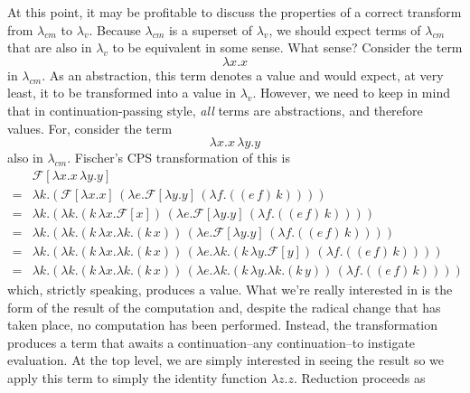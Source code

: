 \documentclass[ms,electronic,twosidetoc,letterpaper,chaptercenter,parttop]{byumsphd}
\begin{document}
At this point, it may be profitable to discuss the properties of a correct transform from
$\lambda_{cm}$ to $\lambda_{v}$. Because $\lambda_{cm}$ is a superset of $\lambda_{v}$, we
should expect terms of $\lambda_{cm}$ that are also in $\lambda_{v}$ to be equivalent in
some sense. What sense? Consider the term
\[
\lambda x.x
\]
in $\lambda_{cm}$. As an abstraction, this term denotes a value and would expect, at very
least, it to be transformed into a value in $\lambda_{v}$. However, we need to keep in
mind that in continuation-passing style, \emph{all} terms are abstractions, and therefore
values. For, consider the term
\[
\lambda x.x\,\lambda y.y
\]
also in $\lambda_{cm}$. Fischer's CPS transformation of this is
\begin{align*}
            &\mathcal{F}[\lambda x.x\,\lambda y.y]\\
= &\lambda k.(\mathcal{F}[\lambda x.x]\,(\lambda e.\mathcal{F}[\lambda y.y]\,(\lambda f.((e\,f)\,k))))\\
= &\lambda k.(\lambda k.(k\,\lambda x.\mathcal{F}[x])\,(\lambda e.\mathcal{F}[\lambda y.y]\,(\lambda f.((e\,f)\,k))))\\
= &\lambda k.(\lambda k.(k\,\lambda x.\lambda k.(k\,x))\,(\lambda e.\mathcal{F}[\lambda y.y]\,(\lambda f.((e\,f)\,k))))\\
= &\lambda k.(\lambda k.(k\,\lambda x.\lambda k.(k\,x))\,(\lambda e.\lambda k.(k\,\lambda y.\mathcal{F}[y])\,(\lambda f.((e\,f)\,k))))\\
= &\lambda k.(\lambda k.(k\,\lambda x.\lambda k.(k\,x))\,(\lambda e.\lambda k.(k\,\lambda y.\lambda k.(k\,y))\,(\lambda f.((e\,f)\,k))))
\end{align*}
which, strictly speaking, produces a value. What we're really interested in is the form of 
the result of the computation and, despite the radical change that has taken place, no 
computation has been performed. Instead, the transformation produces a term that awaits 
a continuation--any continuation--to instigate evaluation. At the top level, we are simply 
interested in seeing the result so we apply this term to simply the identity function 
$\lambda z.z$. Reduction proceeds as
\end{document}
